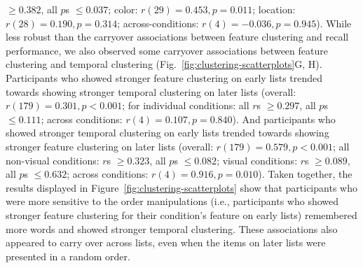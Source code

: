 \documentclass[11pt]{article}
\begin{document}
$\geq 0.382$, all $p$s $\leq 0.037$; color: $r(29) = 0.453, p = 0.011$;
location: $ r(28) = 0.190, p = 0.314$; across-conditions: $r(4) = -0.036, p =
0.945$). While less robust than the carryover associations between feature
clustering and recall performance, we also observed some carryover associations
between feature clustering and temporal clustering
(Fig.~\ref{fig:clustering-scatterplots}G, H). Participants who
showed stronger feature clustering on early lists trended towards showing
stronger temporal clustering on later lists (overall: $r(179) = 0.301, p <
0.001$; for individual conditions: all $r$s $\geq 0.297$, all $p$s $\leq
0.111$; across conditions: $ r(4) = 0.107, p = 0.840$). And participants who
showed stronger temporal clustering on early lists trended towards showing
stronger feature clustering on later lists (overall: $r(179) = 0.579, p <
0.001$; all non-visual conditions: $r$s $\geq 0.323$, all $p$s $\leq 0.082$;
visual conditions: $r$s $\geq 0.089$, all $p$s $\leq 0.632$; across conditions:
$r(4) = 0.916, p = 0.010$). Taken together, the results displayed in
Figure~\ref{fig:clustering-scatterplots} show that participants who were more
sensitive to the order manipulations (i.e., participants who showed stronger
feature clustering for their condition's feature on early lists) remembered
more words and showed stronger temporal clustering. These associations also
appeared to carry over across lists, even when the items on later lists were
presented in a random order.
\end{document}
